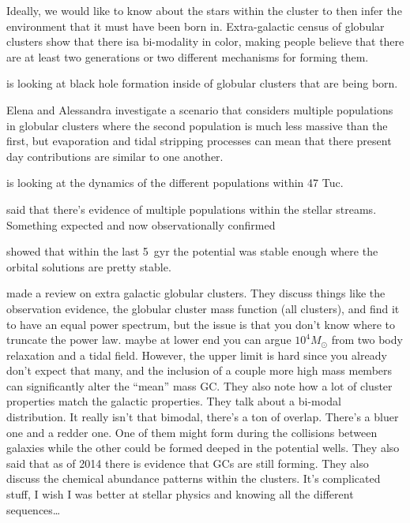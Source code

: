     Ideally, we would like to know about the stars within the cluster to then infer the environment that it must have been born in. Extra-galactic census of globular clusters show that there isa bi-modality in color, making people believe that there are at least two generations or two different mechanisms for forming them. 

    \citet{2025arXiv250507491V} is looking at black hole formation inside of globular clusters that are being born. 

    \citet{2024A&A...681A..45L} Elena and Alessandra investigate a scenario that considers multiple populations in globular clusters where the second population is much less massive than the first, but evaporation and tidal stripping processes can mean that there present day contributions are similar to one another. 

    \citet{2025MNRAS.537.2342C} is looking at the dynamics of the different populations within 47 Tuc.

    \citet{2024MNRAS.529.2413U} said that there's evidence of multiple populations within the stellar streams. Something expected and now observationally confirmed 

    \citet{2023A&A...673A.152I} showed that within the last 5~gyr the potential was stable enough where the orbital solutions are pretty stable. 
    
    \citet{2006ARA&A..44..193B} made a review on extra galactic globular clusters. They discuss things like the observation evidence, the globular cluster mass function (all clusters), and find it to have an equal power spectrum, but the issue is that you don't know where to truncate the power law. maybe at lower end you can argue $10^4 M_\odot$ from two body relaxation and a tidal field. However, the upper limit is hard since you already don't expect that many, and the inclusion of a couple more high mass members can significantly alter the ``mean'' mass GC. They also note how a lot of cluster properties match the galactic properties. They talk about a bi-modal distribution. It really isn't that bimodal, there's a ton of overlap. There's a bluer one and a redder one. One of them might form during the collisions between galaxies while the other could be formed deeped in the potential wells. They also said that as of 2014 there is evidence that GCs are still forming. They also discuss the chemical abundance patterns within the clusters. It's complicated stuff, I wish I was better at stellar physics and knowing all the different sequences\dots
    
